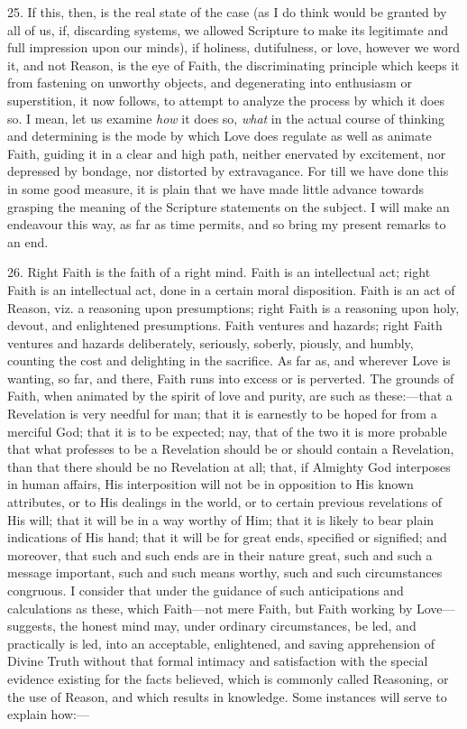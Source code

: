 25. If this, then, is the real state of the case (as I do think
would be granted by all of us, if, discarding systems, we allowed
Scripture to make its legitimate and full impression upon our minds),
if holiness, dutifulness, or love, however we word it, and not Reason,
is the eye of Faith, the discriminating principle which keeps it from
fastening on unworthy objects, and degenerating into enthusiasm or
superstition, it now follows, to attempt to analyze the process by
which it does so. I mean, let us examine \emph{how} it does so, \emph{what}
in the actual course of thinking and determining is the mode by which
Love does regulate as well as animate Faith, guiding it in a clear and
high path, neither enervated by excitement, nor depressed by bondage,
nor distorted by extravagance. For till we have done this in some good
measure, it is plain that we have made little advance towards grasping
the meaning of the Scripture statements on the subject. I will make an
endeavour this way, as far as time permits, and so bring my present
remarks to an end.

26. Right Faith is the faith of a right mind. Faith is an
intellectual act; right Faith is an intellectual act, done in a
certain moral disposition. Faith is an act of Reason, viz. a reasoning
upon presumptions; right Faith is a reasoning upon holy, devout, and
enlightened presumptions. Faith ventures and hazards; right Faith
ventures and hazards deliberately, seriously, soberly, piously, and
humbly, counting the cost and delighting in the sacrifice. As far as,
and wherever Love is wanting, so far, and there, Faith runs into
excess or is perverted. The grounds of Faith, when animated by the
spirit of love and purity, are such as these:—that a Revelation is
very needful for man; that it is earnestly to be hoped for from a
merciful God; that it is to be expected; nay, that of the two it is
more probable that what professes to be a Revelation should be or
should contain a Revelation, than that there should be no Revelation
at all; that, if Almighty God interposes in human affairs, His
interposition will not be in opposition to His known attributes, or to
His dealings in the world, or to certain previous revelations of His
will; that it will be in a way worthy of Him; that it is likely to
bear plain indications of His hand; that it will be for great ends,
specified or signified; and moreover, that such and such ends are in
their nature great, such and such a message important, such and such
means worthy, such and such circumstances congruous. I consider that
under the guidance of such anticipations and calculations as these,
which Faith—not mere Faith, but Faith working by Love—suggests,
the honest mind may, under ordinary circumstances, be led, and
practically is led, into an acceptable, enlightened, and saving
apprehension of Divine Truth without that formal intimacy and
satisfaction with the special evidence existing for the facts
believed, which is commonly called Reasoning, or the use of Reason,
and which results in knowledge. Some instances will serve to explain
how:—

